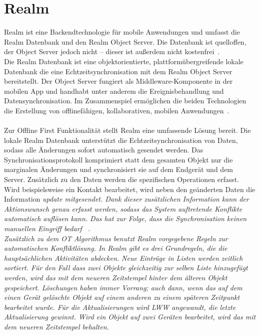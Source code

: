 \section{\label{sub:realm}Realm}
Realm ist eine Backendtechnologie für mobile Anwendungen und umfasst die Realm Datenbank und den Realm Object Server.
Die Datenbank ist quelloffen, der Object Server jedoch nicht -- dieser ist außerdem nicht kostenfrei~\cite{realm}.\\
Die Realm Datenbank ist eine objektorientierte, plattformübergreifende lokale Datenbank die eine Echtzeitsynchronisation mit dem Realm Object Server bereitstellt.
Der Object Server fungiert als \gls{Middleware}-Komponente in der mobilen \gls{App} und handhabt unter anderem die Ereignisbehandlung und Datensynchronisation.
Im Zusammenspiel ermöglichen die beiden Technologien die Erstellung von offlinefähigen, kollaborativen, mobilen Anwendungen~\cite{realm_whitepaper}.\\\\
%
%
Zur Offline First Funktionalität stellt Realm eine umfassende Lösung bereit.
Die lokale Realm Datenbank unterstützt die Echtzeitsynchronisation von Daten, sodass alle Änderungen sofort automatisch gesendet werden.
Das Synchronisationsprotokoll komprimiert statt dem gesamten Objekt nur die marginalen Änderungen und synchronisiert sie auf dem Endgerät und dem Server.
Zusätzlich zu den Daten werden die spezifischen Operationen erfasst. 
Wird beispielsweise ein Kontakt bearbeitet, wird neben den geänderten Daten die Information \it{update} mitgesendet.
Dank dieser zusätzlichen Information kann der Aktionswunsch genau erfasst werden, sodass das System auftretende Konflikte automatisch auflösen kann.
Das hat zur Folge, dass die Synchronisation keinen manuellen Eingriff bedarf ~\cite{realm_offline_whitepaper}.\\
%
Zusätzlich zu dem \gls{OT} Algorithmus benutzt Realm vorgegebene Regeln zur automatischen Konfliktlösung.
In Realm gibt es drei Grundregeln, die die hauptsächlichen Aktivitäten abdecken.
Neue Einträge in Listen werden zeitlich sortiert. Für den Fall dass zwei Objekte gleichzeitig zur selben Liste hinzugefügt werden, wird das mit dem neueren Zeitstempel hinter dem älteren Objekt gespeichert.
Löschungen haben immer Vorrang; auch dann, wenn das auf dem einen Gerät gelöschte Objekt auf einem anderen zu einem späteren Zeitpunkt bearbeitet wurde.
Für die Aktualisierungen wird \gls{LWW} angewandt, die letzte Aktualisierung gewinnt.
Wird ein Objekt auf zwei Geräten bearbeitet, wird das mit dem neueren Zeitstempel behalten.\\ 
